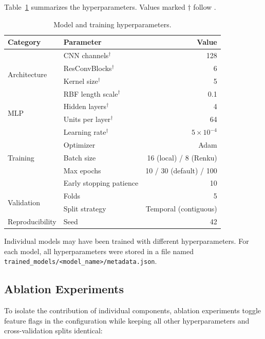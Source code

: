 Table~\ref{tab:hyperparams} summarizes the hyperparameters. Values marked $\dagger$ follow \citet{vaughan2022}.

\begin{table}[ht]
\centering
\caption{Model and training hyperparameters.}
\label{tab:hyperparams}
\begin{tabular}{@{}llr@{}}
\toprule
\textbf{Category} & \textbf{Parameter} & \textbf{Value} \\
\midrule
\multirow{4}{*}{Architecture}
    & CNN channels$^\dagger$            & 128 \\
    & ResConvBlocks$^\dagger$           & 6 \\
    & Kernel size$^\dagger$             & 5 \\
    & RBF length scale$^\dagger$        & 0.1 \\
\midrule
\multirow{2}{*}{MLP}
    & Hidden layers$^\dagger$           & 4 \\
    & Units per layer$^\dagger$         & 64 \\
\midrule
\multirow{5}{*}{Training}
    & Learning rate$^\dagger$           & $5 \times 10^{-4}$ \\
    & Optimizer                         & Adam \\
    & Batch size                        & 16 (local) / 8 (Renku) \\
    & Max epochs                        & 10 / 30 (default) / 100 \\
    & Early stopping patience           & 10 \\
\midrule
\multirow{2}{*}{Validation}
    & Folds                             & 5 \\
    & Split strategy                    & Temporal (contiguous) \\
\midrule
Reproducibility & Seed                  & 42 \\
\bottomrule
\end{tabular}
\end{table}

Individual models may have been trained with different hyperparameters.
For each model, all hyperparameters were stored in a file named \newline \texttt{trained\_models/<model\_name>/metadata.json}.

\subsection{Ablation Experiments}

To isolate the contribution of individual components, ablation experiments toggle feature flags in the configuration while keeping all other hyperparameters and cross-validation splits identical:

